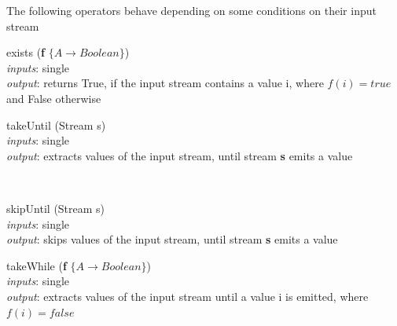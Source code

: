 \documentclass{dithesis}
\begin{document}
The following operators behave depending on some conditions on their input stream
\begin{description}

\begin{minipage}[c]{\lll}
\item[exists] (\textbf{f} $\{ A \to Boolean \}$) \\
	\textit{inputs}: single \\
	\textit{output}: returns True, if the input stream contains a value i, where $f(i) = true$ and False otherwise
\end{minipage}
\hfill
\begin{minipage}[c]{\rrr}

\end{minipage}
\newline \newline \newline
\begin{minipage}[c]{\lll}
\item[takeUntil] (Stream s) \\
	\textit{inputs}: single \\
	\textit{output}: extracts values of the input stream, until stream \textbf{s} emits a value
\end{minipage}
\hfill
\\
\begin{minipage}[c]{\lll}
\item[skipUntil] (Stream s) \\
	\textit{inputs}: single \\
	\textit{output}: skips values of the input stream, until stream \textbf{s} emits a value
\end{minipage}
\hfill
\newline \newline \newline
\begin{minipage}[c]{\lll}
\item[takeWhile] (\textbf{f} $\{ A \to Boolean \}$) \\
	\textit{inputs}: single \\
	\textit{output}: extracts values of the input stream until a value i is emitted, where $f(i) = false$
\end{minipage}
\hfill
\begin{minipage}[c]{\rrr}

\end{minipage}
\newline \newline \newline

\end{description}
\end{document}

